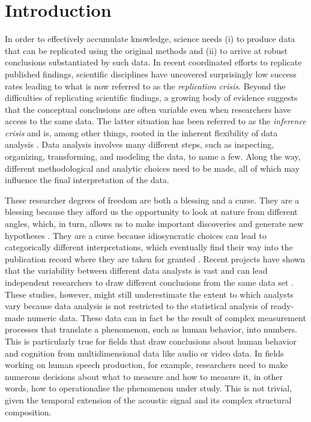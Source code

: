 \documentclass[Review,times,sageh]{sagej}
\begin{document}
\section{Introduction}\label{introduction}

In order to effectively accumulate knowledge, science needs (i) to
produce data that can be replicated using the original methods and (ii)
to arrive at robust conclusions substantiated by such data. In recent
coordinated efforts to replicate published findings, scientific
disciplines have uncovered surprisingly low success rates
\citep[e.g.,][]{open2015estimating, camerer2018evaluating} leading to
what is now referred to as the \emph{replication crisis}. Beyond the
difficulties of replicating scientific findings, a growing body of
evidence suggests that the conceptual conclusions are often variable
even when researchers have access to the same data. The latter situation
has been referred to as the \emph{inference crisis}
\citep{rotello2015more, starns2019assessing} and is, among other things,
rooted in the inherent flexibility of data analysis \citep[often
referred to as researcher degrees of
freedom:][]{simmons2011false, gelman2014statistical}. Data analysis
involves many different steps, such as inspecting, organizing,
transforming, and modeling the data, to name a few. Along the way,
different methodological and analytic choices need to be made, all of
which may influence the final interpretation of the data.

These researcher degrees of freedom are both a blessing and a curse.
They are a blessing because they afford us the opportunity to look at
nature from different angles, which, in turn, allows us to make
important discoveries and generate new hypotheses
\citep[e.g.,][]{box1976science, tukey1977exploratory, de2014thought}.
They are a curse because idiosyncratic choices can lead to categorically
different interpretations, which eventually find their way into the
publication record where they are taken for granted
\citep{simmons2011false}. Recent projects have shown that the
variability between different data analysts is vast and can lead
independent researchers to draw different conclusions from the same data
set
\citep[e.g.,][]{silberzahn2018many, starns2019assessing, botvinik2020variability}.
These studies, however, might still underestimate the extent to which
analysts vary because data analysis is not restricted to the statistical
analysis of ready-made numeric data. These data can in fact be the
result of complex measurement processes that translate a phenomenon,
such as human behavior, into numbers. This is particularly true for
fields that draw conclusions about human behavior and cognition from
multidimensional data like audio or video data. In fields working on
human speech production, for example, researchers need to make numerous
decisions about what to measure and how to measure it, in other words,
how to operationalise the phenomenon under study. This is not trivial,
given the temporal extension of the acoustic signal and its complex
structural composition.
\end{document}
